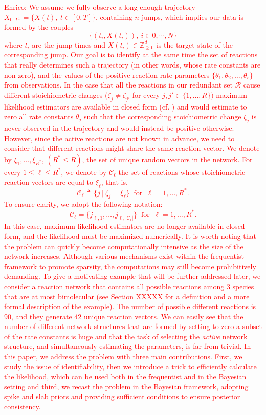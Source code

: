 \documentclass[pdflatex,sn-mathphys-num]{sn-jnl}%
\theoremstyle{thmstyleone}%
\theoremstyle{thmstyletwo}%
\theoremstyle{thmstylethree}%
\begin{document}
\textcolor{red}{
Enrico: We assume we fully observe a long enough trajectory $X_{0:T} : =  \{X(t), ~ t\in[0,T]\}$, containing $n$ jumps, which implies our data is formed by the couples
\[\{(t_i, X(t_i)),~ i\in{0,\cdots,N}\}\]
where $t_i$ are the jump times and $X(t_i)\in \mathbb{Z}^d_{\geq 0}$ is the target state of the corresponding jump. 
Our goal is to identify at the same time the set of reactions that really determines such a trajectory (in other words, whose rate constants are non-zero), and the values of the positive reaction rate parameters $\{ \theta_1, \theta_2, \ldots, \theta_r \}$ from observations. 
In the case that all the reactions in our redundant set $\mathcal{R}$ cause different stoichiometric changes ($\zeta_j\neq \zeta_{j'}$ for every $j,j' \in \{1, \dots, R\})$ maximum likelihood estimators are available in closed form (cf. \cite{Wilkinson2018}) and would estimate to zero all rate constants $\theta_j$ such that the corresponding stoichiometric change $\zeta_j$ is never observed in the trajectory and would instead be positive otherwise.
However, since the active reactions are not known in advance, we need to consider that different reactions might share the same reaction vector. We denote by $\xi_1, \dots, \xi_{R^*}$, $(R^*\leq R )$, the set of unique random vectors in the network.
For every $1 \leq \ell \leq R^*$, we denote by $\mathcal C_\ell$ the set of reactions whose stoichiometric reaction vectors are equal to $\xi_\ell$, that is,
\[
\mathcal C_\ell \triangleq \{j \ | \ \zeta_j=\xi_\ell \}
\ \text{ for } \ 
\ell=1,\dots,R^*.
\]
To ensure clarity, we adopt the following notation:
\[
\mathcal C_\ell = \{ j_{\ell, 1}, \dots, j_{\ell, \left| \mathcal C_\ell \right|} \}
\ \text{ for } \ 
\ell=1,\dots,R^*.
\]
In this case, maximum likelihood estimators are no longer available in closed form, and the likelihood must be maximized numerically. It is worth noting that the problem can quickly become computationally intensive as the size of the network increases. Although various mechanisms exist within the frequentist framework to promote sparsity, the computations may still become prohibitively demanding.
To give a motivating example that will be further addressed later, we consider a reaction network that contains all possible reactions among 3 species that are at most bimolecular (see Section XXXXX for a definition and a more formal description of the example). The number of possible different reactions is 90, and they generate 42 unique reaction vectors. We can easily see that the number of different network structures that are formed by setting to zero a subset of the rate constants is huge and that the task of selecting the \emph{active} network structure, and simultaneously estimating the parameters, is far from trivial.
In this paper, we address the problem with three main contributions. First, we study the issue of identifiability, then we introduce a trick to efficiently calculate the likelihood, which can be used both in the frequentist and in the Bayesian setting and third, we recast the problem in the Bayesian framework, adopting spike and slab priors and providing sufficient conditions to ensure posterior consistency. 
}
\end{document}
